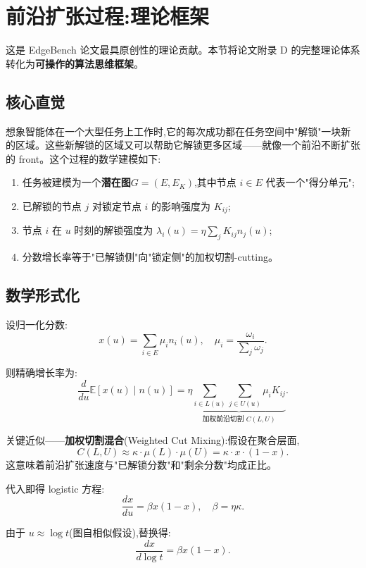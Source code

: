 \documentclass[a4paper,11pt]{article}
\def\E{\mathbb{E}}
\begin{document}
\section{前沿扩张过程:理论框架}

这是 EdgeBench 论文最具原创性的理论贡献。本节将论文附录 D 的完整理论体系转化为\textbf{可操作的算法思维框架}。

\subsection{核心直觉}

想象智能体在一个大型任务上工作时,它的每次成功都在任务空间中"解锁"一块新的区域。这些新解锁的区域又可以帮助它解锁更多区域——就像一个前沿不断扩张的 front。这个过程的数学建模如下:

\begin{enumerate}
    \item 任务被建模为一个\textbf{潜在图}$G = (E, E_{K})$,其中节点 $i \in E$ 代表一个"得分单元";
    \item 已解锁的节点 $j$ 对锁定节点 $i$ 的影响强度为 $K_{ij}$;
    \item 节点 $i$ 在 $u$ 时刻的解锁强度为 $\lambda_{i}(u) = \eta \sum_{j} K_{ij} n_{j}(u)$;
    \item 分数增长率等于"已解锁侧"向"锁定侧"的加权切割-cutting。
\end{enumerate}

\subsection{数学形式化}

设归一化分数:
\[
    x(u) = \sum_{i \in E} \mu_{i} n_{i}(u), \quad \mu_{i} = \frac{\omega_{i}}{\sum_{j} \omega_{j}}.
\]

则精确增长率为:
\[
    \frac{d}{du}\E[x(u) \mid n(u)] = \eta \underbrace{\sum_{i \in L(u)}\sum_{j \in U(u)} \mu_{i} K_{ij}}_{\text{加权前沿切割 } C(L,U)}.
\tag{ALG-2}
\]

关键近似——\textbf{加权切割混合}(Weighted Cut Mixing):假设在聚合层面,
\[
    C(L,U) \approx \kappa \cdot \mu(L) \cdot \mu(U) = \kappa \cdot x \cdot (1-x).
\tag{ALG-3}
\]
这意味着前沿扩张速度与"已解锁分数"和"剩余分数"均成正比。

代入即得 logistic 方程:
\[
    \frac{dx}{du} = \beta x(1-x), \quad \beta = \eta \kappa.
\tag{ALG-4}
\]

由于 $u \approx \log t$(图自相似假设),替换得:
\[
    \frac{dx}{d\log t} = \beta x(1-x).
\tag{ALG-5}
\]
\end{document}
